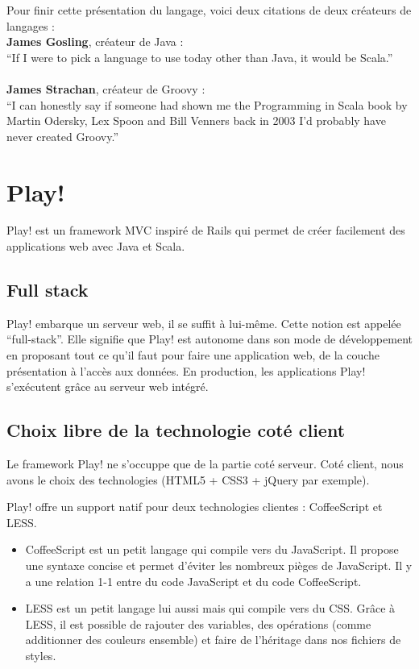 Pour finir cette présentation du langage, voici deux citations de deux
créateurs de langages :\\
\textbf{James Gosling}, créateur de Java :\\
``If I were to pick a language to use today other than Java, it would be
Scala.''\\\\
\textbf{James Strachan}, créateur de Groovy :\\
``I can honestly say if someone had shown me the Programming in Scala
book by Martin Odersky, Lex Spoon and Bill Venners back in 2003 I’d probably
have never created Groovy.''\\




\section{Play!}

Play! est un framework MVC inspiré de Rails qui permet de créer facilement des
applications web avec Java et Scala.


\subsection{Full stack}
Play! embarque un serveur web, il se suffit à lui-même. Cette notion
est appelée “full-stack”. Elle signifie que Play! est autonome 
dans son mode de développement en proposant tout ce qu’il faut pour faire
une application web, de la couche présentation à l’accès aux données.
En production, les applications Play! s'exécutent grâce au serveur web intégré.

\subsection{Choix libre de la technologie coté client}

Le framework Play! ne s'occuppe que de la partie coté serveur.
Coté client, nous avons le choix des technologies (HTML5 + CSS3 + jQuery
par exemple).

Play! offre un support natif pour deux technologies clientes :
CoffeeScript et LESS.
\begin{itemize}
\item CoffeeScript est un petit langage qui compile vers du JavaScript.
  Il propose une syntaxe concise et permet d'éviter les nombreux pièges de
  JavaScript. Il y a une relation 1-1 entre du code JavaScript et du code
  CoffeeScript.
\item LESS est un petit langage lui aussi mais qui compile vers du CSS.
  Grâce à LESS, il est possible de rajouter des variables, des opérations
  (comme additionner des couleurs ensemble) et faire de l'héritage dans nos
  fichiers de styles.
\end{itemize}

